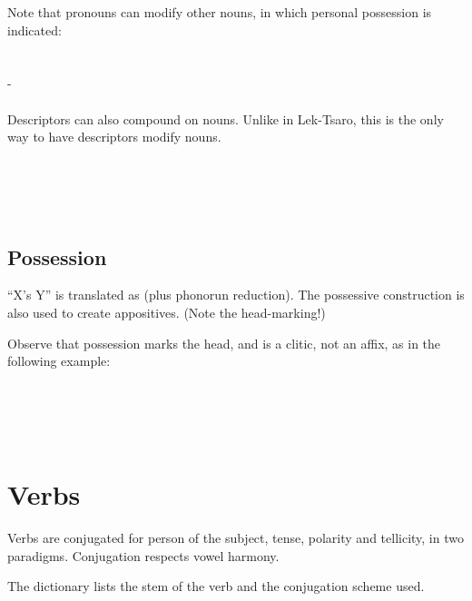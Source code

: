 \documentclass{book}
\begin{document}
Note that pronouns can modify other nouns, in which personal possession is indicated: \\
~\\
 \\
- \\
    \\

Descriptors can also compound on nouns. Unlike in Lek-Tsaro, this is the only way to have descriptors modify nouns. \\
~\\
 \\
 \\
 \\
 

\section{Possession}

``X's Y'' is translated as  (plus phonorun reduction). The possessive construction is also used to create appositives. (Note the head-marking!)

Observe that possession marks the head, and  is a clitic, not an affix, as in the following example: \\
~\\
 \\
 \\
  \\
 

\chapter{Verbs}

Verbs are conjugated for person of the subject, tense, polarity and tellicity, in two paradigms. Conjugation respects vowel harmony.

The dictionary lists the stem of the verb and the conjugation scheme used.
\end{document}

